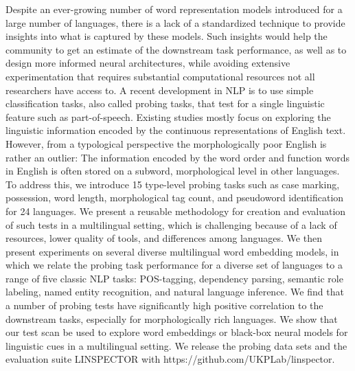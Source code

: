 Despite an ever-growing number of word representation models introduced for a large number of languages, there is a lack of a standardized technique to provide insights into what is captured by these models. Such insights would help the community to get an estimate of the downstream task performance, as well as to design more informed neural architectures, while avoiding extensive experimentation that requires substantial computational resources not all researchers have access to. A recent development in NLP is to use simple classification tasks, also called probing tasks, that test for a single linguistic feature such as part-of-speech. Existing studies mostly focus on exploring the linguistic information encoded by the continuous representations of English text. However, from a typological perspective the morphologically poor English is rather an outlier: The information encoded by the word order and function words in English is often stored on a subword, morphological level in other languages. To address this, we introduce 15 type-level probing tasks such as case marking, possession, word length, morphological tag count, and pseudoword identification for 24 languages. We present a reusable methodology for creation and evaluation of such tests in a multilingual setting, which is challenging because of a lack of resources, lower quality of tools, and differences among languages. We then present experiments on several diverse multilingual word embedding models, in which we relate the probing task performance for a diverse set of languages to a range of five classic NLP tasks: POS-tagging, dependency parsing, semantic role labeling, named entity recognition, and natural language inference. We find that a number of probing tests have significantly high positive correlation to the downstream tasks, especially for morphologically rich languages. We show that our test scan be used to explore word embeddings or black-box neural models for linguistic cues in a multilingual setting. We release the probing data sets and the evaluation suite LINSPECTOR with https://github.com/UKPLab/linspector.